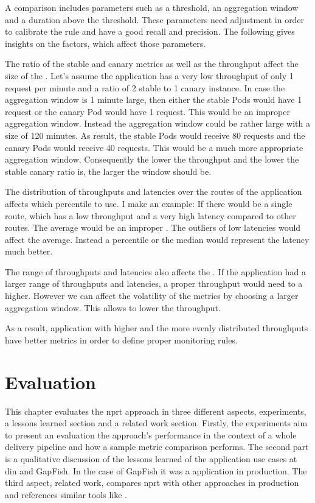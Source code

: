 A comparison includes parameters such as a threshold, an aggregation window and a duration
above the threshold. These parameters need adjustment in order to calibrate the rule and
have a good recall and precision. The following gives insights on the factors, which
affect those parameters.

The ratio of the stable and canary metrics as well as the throughput affect the size of
the . Let's assume the application has a very low throughput of
only 1 request per minute and a ratio of 2 stable to 1 canary instance. In case the
aggregation window is 1 minute large, then either the stable Pods would have 1 request or
the canary Pod would have 1 request. This would be an improper aggregation window. Instead
the aggregation window could be rather large with a size of 120 minutes. As result, the
stable Pods would receive 80 requests and the canary Pods would receive 40 requests. This
would be a much more appropriate aggregation window. Consequently the lower the throughput
and the lower the stable canary ratio is, the larger the window should be.

The distribution of throughputs and latencies over the routes of the application affects
which percentile to use. I make an example: If there would be a single route, which has a
low throughput and a very high latency compared to other routes. The average would be an
improper . The outliers of low latencies would affect the
average. Instead a percentile or the median would represent the latency much better.

The range of throughputs and latencies also affects the . If the
application had a larger range of throughputs and latencies, a proper throughput would
need to a higher. However we can affect the volatility of the metrics by choosing a larger
aggregation window. This allows to lower the throughput.

As a result, application with higher and the more evenly distributed throughputs have
better metrics in order to define proper monitoring rules.

\chapter{Evaluation}
\label{chap:eval}

This chapter evaluates the \gls{nprt} approach in three different aspects, experiments, a
lessons learned section and a related work section. Firstly, the experiments aim to
present an evaluation the approach's performance in the context of a whole delivery
pipeline and how a sample metric comparison performs. The second part is a qualitative
discussion of the lessons learned of the application use cases at \gls{din} and GapFish.
In the case of GapFish it was a application in production. The third aspect, related work,
compares \gls{nprt} with other approaches in production and references similar tools like
\deployer.

